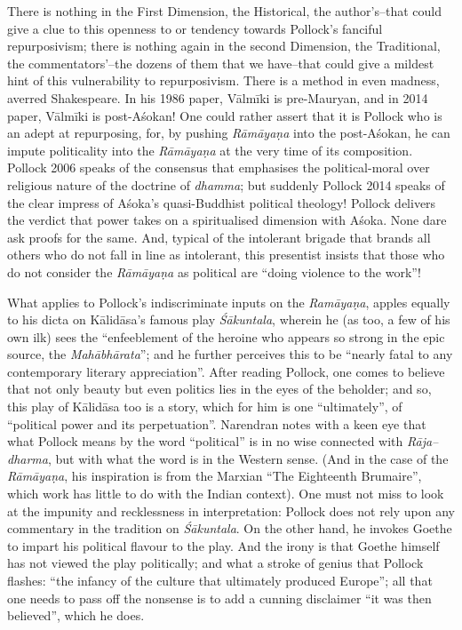 There is nothing in the First Dimension, the Historical, the author’s–that could give a clue to this openness to or tendency towards Pollock’s fanciful repurposivism; there is nothing again in the second Dimension, the Traditional, the commentators’–the dozens of them that we have–that could give a mildest hint of this vulnerability to repurposivism. There is a method in even madness, averred Shakespeare. In his 1986 paper, Vālmīki is pre-Mauryan, and in 2014 paper, Vālmīki is post-Aśokan! One could rather assert that it is Pollock who is an adept at repurposing, for, by pushing \textit{Rāmāyaṇa} into the post-Aśokan, he can impute politicality into the \textit{Rāmāyaṇa} at the very time of its composition. Pollock 2006 speaks of the consensus that emphasises the political-moral over religious nature of the doctrine of \textit{dhamma}; but suddenly Pollock 2014 speaks of the clear impress of Aśoka’s quasi-Buddhist political theology! Pollock delivers the verdict that power takes on a spiritualised dimension with Aśoka. None dare ask proofs for the same. And, typical of the intolerant brigade that brands all others who do not fall in line as intolerant, this presentist insists that those who do not consider the \textit{Rāmāyaṇa} as political are “doing violence to the work”!

What applies to Pollock’s indiscriminate inputs on the \textit{Ramāyaṇa}, apples equally to his dicta on Kālidāsa’s famous play \textit{Śākuntala}, wherein he (as too, a few of his own ilk) sees the “enfeeblement of the heroine who appears so strong in the epic source, the \textit{Mahābhārata}”; and he further perceives this to be “nearly fatal to any contemporary literary appreciation”. After reading Pollock, one comes to believe that not only beauty but even politics lies in the eyes of the beholder; and so, this play of Kālidāsa too is a story, which for him is one “ultimately”, of “political power and its perpetuation”. Narendran notes with a keen eye that what Pollock means by the word “political” is in no wise connected with \textit{Rāja–dharma}, but with what the word is in the Western sense. (And in the case of the \textit{Rāmāyaṇa}, his inspiration is from the Marxian “The Eighteenth Brumaire”, which work has little to do with the Indian context). One must not miss to look at the impunity and recklessness in interpretation: Pollock does not rely upon any commentary in the tradition on \textit{Śākuntala}. On the other hand, he invokes Goethe to impart his political flavour to the play. And the irony is that Goethe himself has not viewed the play politically; and what a stroke of genius that Pollock flashes: “the infancy of the culture that ultimately produced Europe”; all that one needs to pass off the nonsense is to add a cunning disclaimer “it was then believed”, which he does.


